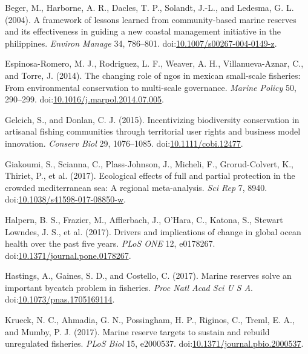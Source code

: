 \documentclass{frontiersSCNS}
\begin{document}
\hypertarget{ref-beger_2004-Y8}{}
Beger, M., Harborne, A. R., Dacles, T. P., Solandt, J.-L., and Ledesma,
G. L. (2004). A framework of lessons learned from community-based marine
reserves and its effectiveness in guiding a new coastal management
initiative in the philippines. \emph{Environ Manage} 34, 786--801.
doi:\href{https://doi.org/10.1007/s00267-004-0149-z}{10.1007/s00267-004-0149-z}.

\hypertarget{ref-espinosaromero_2014-PY}{}
Espinosa-Romero, M. J., Rodriguez, L. F., Weaver, A. H.,
Villanueva-Aznar, C., and Torre, J. (2014). The changing role of ngos in
mexican small-scale fisheries: From environmental conservation to
multi-scale governance. \emph{Marine Policy} 50, 290--299.
doi:\href{https://doi.org/10.1016/j.marpol.2014.07.005}{10.1016/j.marpol.2014.07.005}.

\hypertarget{ref-gelcich_2015-Gw}{}
Gelcich, S., and Donlan, C. J. (2015). Incentivizing biodiversity
conservation in artisanal fishing communities through territorial user
rights and business model innovation. \emph{Conserv Biol} 29,
1076--1085.
doi:\href{https://doi.org/10.1111/cobi.12477}{10.1111/cobi.12477}.

\hypertarget{ref-giakoumi_2017-V2}{}
Giakoumi, S., Scianna, C., Plass-Johnson, J., Micheli, F.,
Grorud-Colvert, K., Thiriet, P., et al. (2017). Ecological effects of
full and partial protection in the crowded mediterranean sea: A regional
meta-analysis. \emph{Sci Rep} 7, 8940.
doi:\href{https://doi.org/10.1038/s41598-017-08850-w}{10.1038/s41598-017-08850-w}.

\hypertarget{ref-halpern_2017-Zi}{}
Halpern, B. S., Frazier, M., Afflerbach, J., O'Hara, C., Katona, S.,
Stewart Lowndes, J. S., et al. (2017). Drivers and implications of
change in global ocean health over the past five years. \emph{PLoS ONE}
12, e0178267.
doi:\href{https://doi.org/10.1371/journal.pone.0178267}{10.1371/journal.pone.0178267}.

\hypertarget{ref-hastings_2017-sm}{}
Hastings, A., Gaines, S. D., and Costello, C. (2017). Marine reserves
solve an important bycatch problem in fisheries. \emph{Proc Natl Acad
Sci U S A}.
doi:\href{https://doi.org/10.1073/pnas.1705169114}{10.1073/pnas.1705169114}.

\hypertarget{ref-krueck_2017-J1}{}
Krueck, N. C., Ahmadia, G. N., Possingham, H. P., Riginos, C., Treml, E.
A., and Mumby, P. J. (2017). Marine reserve targets to sustain and
rebuild unregulated fisheries. \emph{PLoS Biol} 15, e2000537.
doi:\href{https://doi.org/10.1371/journal.pbio.2000537}{10.1371/journal.pbio.2000537}.
\end{document}
